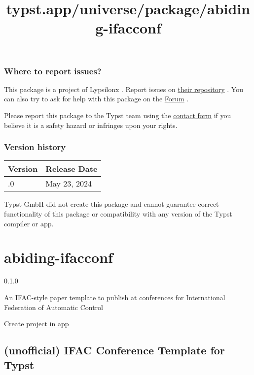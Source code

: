 \subsubsection{Where to report issues?}\label{where-to-report-issues}

This package is a project of Lypsilonx . Report issues on
\href{https://github.com/Lypsilonx/boxr}{their repository} . You can
also try to ask for help with this package on the
\href{https://forum.typst.app}{Forum} .

Please report this package to the Typst team using the
\href{https://typst.app/contact}{contact form} if you believe it is a
safety hazard or infringes upon your rights.

\label{versions}
\subsubsection{Version history}\label{version-history}

\begin{longtable}[]{@{}ll@{}}
\toprule\noalign{}
Version & Release Date \\
\midrule\noalign{}
\endhead
\bottomrule\noalign{}
\endlastfoot
0.1.0 & May 23, 2024 \\
\end{longtable}

Typst GmbH did not create this package and cannot guarantee correct
functionality of this package or compatibility with any version of the
Typst compiler or app.


\title{typst.app/universe/package/abiding-ifacconf}

\label{banner}
\label{template-thumbnail}

\section{abiding-ifacconf}\label{abiding-ifacconf}

{ 0.1.0 }

An IFAC-style paper template to publish at conferences for International
Federation of Automatic Control

\href{/app?template=abiding-ifacconf&version=0.1.0}{Create project in
app}

\label{readme}
\subsection{(unofficial) IFAC Conference Template for
Typst}\label{unofficial-ifac-conference-template-for-typst}

